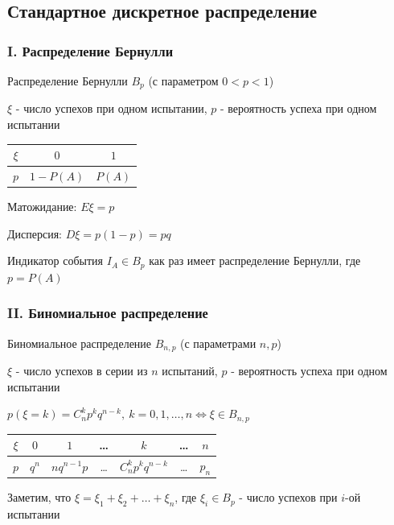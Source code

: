 \documentclass[12pt]{article}
\begin{document}
    \subsection{Стандартное дискретное распределение}

    \subsubsection{I. Распределение Бернулли}

    Распределение Бернулли $B_p$ (с параметром $0 < p < 1$)

    $\xi$ - число успехов при одном испытании, $p$ - вероятность успеха при одном испытании
    
    \smallvspace

    \begin{tabular}{c|c|c}
        $\xi$ & $0$        & $1$    \\
        \hline
        $p$   & $1 - P(A)$ & $P(A)$
    \end{tabular}

    \smallvspace

    Матожидание: $E\xi = p$

    Дисперсия: $D\xi = p(1 - p) = pq$

    \Ex Индикатор события $I_A \in B_p$ как раз имеет распределение Бернулли, где $p = P(A)$

    \subsubsection{II. Биномиальное распределение}

    Биномиальное распределение $B_{n,p}$ (с параметрами $n, p$)

    $\xi$ - число успехов в серии из $n$ испытаний, $p$ - вероятность успеха при одном испытании

    $p(\xi = k) = C^k_n p^k q^{n - k}, \ k = 0, 1, \dots, n \Longleftrightarrow \xi \in B_{n,p}$

    \smallvspace

    \begin{tabular}{c|c|c|c|c|c|c}
        $\xi$ & $0$        & $1$ & \dots & $k$ & \dots & $n$    \\
        \hline
        $p$   & $q^n$ & $n q^{n - 1} p$ & \dots & $C^k_n p^k q^{n - k}$ & \dots & $p_n$
    \end{tabular}

    \smallvspace

    Заметим, что $\xi = \xi_1 + \xi_2 + \dots + \xi_n$, где $\xi_i \in B_p$ - число успехов при $i$-ой испытании
\end{document}
